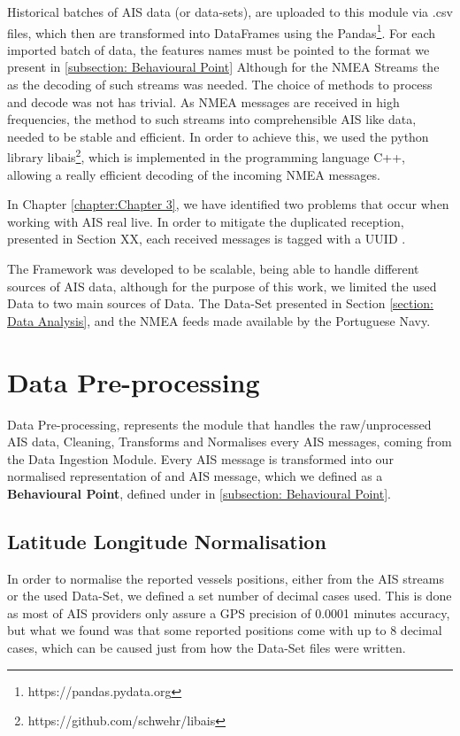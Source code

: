 Historical batches of AIS data (or data-sets), are uploaded to this module via .csv files, which then are transformed into DataFrames using the Pandas\footnote{https://pandas.pydata.org}. For each imported batch of data, the features names must be pointed to the format we present in \ref{subsection: Behavioural Point}
Although for the NMEA Streams the as the decoding of such streams was needed. The choice of methods to process and decode was not has trivial. As NMEA messages are received in high frequencies, the method to such streams into comprehensible AIS like data, needed to be stable and efficient. In order to achieve this, we used the python library libais\footnote{https://github.com/schwehr/libais}, which is implemented in the programming language C++, allowing a really efficient decoding of the incoming NMEA messages. 

In Chapter \ref{chapter:Chapter 3}, we have identified two problems that occur when working with AIS real live. In order to mitigate the duplicated reception, presented in Section XX, each received messages is tagged with a UUID .

The Framework was developed to be scalable, being able to handle different sources of AIS data, although for the purpose of this work, we limited the used Data to two main sources of Data. The Data-Set presented in Section \ref{section: Data Analysis}, and the NMEA feeds made available by the Portuguese Navy.


\section{Data Pre-processing}
Data Pre-processing, represents the module that handles the raw/unprocessed AIS data, Cleaning, Transforms and Normalises every AIS messages, coming from the Data Ingestion Module. Every AIS message is transformed into our normalised representation of and AIS message, which we defined as a \textbf{Behavioural Point}, defined under in \ref{subsection: Behavioural Point}.

\subsection{Latitude Longitude Normalisation}
In order to normalise the reported vessels positions, either from the AIS streams or the used Data-Set, we defined a set number of decimal cases used. This is done as most of AIS providers only assure a GPS precision of 0.0001 minutes accuracy, but what we found was that some reported positions come with up to 8 decimal cases, which can be caused just from how the Data-Set files were written.

